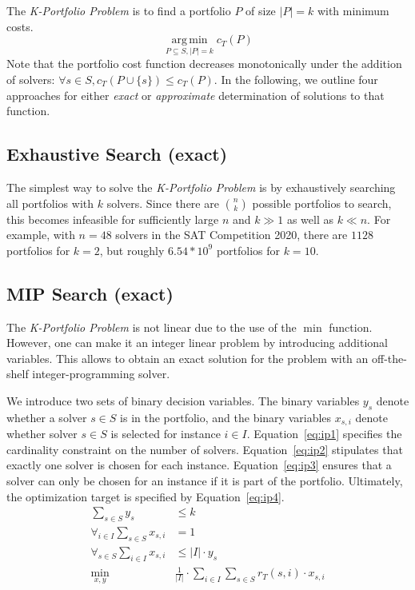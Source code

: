 \documentclass[conference]{IEEEtran}
\DeclareMathOperator*{\argmin}{arg\,min}
\begin{document}
The \emph{K-Portfolio Problem} is to find a portfolio $P$ of size $|P| = k$ with minimum costs.%
$$
\argmin\limits_{P \subseteq S, |P| = k} c_{T}(P)
$$
Note that the portfolio cost function decreases monotonically under the addition of solvers: $\forall s \in S, c_{T}(P \cup \{s\}) \leq c_{T}(P)$. 
In the following, we outline four approaches for either \emph{exact} or \emph{approximate} determination of solutions to that function. 

\subsection{Exhaustive Search (exact)}

The simplest way to solve the \emph{K-Portfolio Problem} is by exhaustively searching all portfolios with $k$ solvers. 
Since there are $\binom{n}{k}$ possible portfolios to search, this becomes infeasible for sufficiently large $n$ and $k \gg 1$ as well as $k \ll n$.
For example, with $n=48$ solvers in the SAT Competition 2020, there are $1128$ portfolios for $k=2$, but roughly $6.54 * 10^9$ portfolios for $k=10$.

\subsection{MIP Search (exact)}

The \emph{K-Portfolio Problem} is not linear due to the use of the $\min$ function.
However, one can make it an integer linear problem by introducing additional variables.
This allows to obtain an exact solution for the problem with an off-the-shelf integer-programming solver.

We introduce two sets of binary decision variables. 
The binary variables $y_s$ denote whether a solver $s \in S$ is in the portfolio, and 
the binary variables $x_{s,i}$ denote whether solver $s \in S$ is selected for instance $i \in I$. 
Equation~\ref{eq:ip1} specifies the cardinality constraint on the number of solvers. 
Equation~\ref{eq:ip2} stipulates that exactly one solver is chosen for each instance. 
Equation~\ref{eq:ip3} ensures that a solver can only be chosen for an instance if it is part of the portfolio. 
Ultimately, the optimization target is specified by Equation~\ref{eq:ip4}.%
\begin{align}
	\sum_{s \in S} y_s &\leq k \label{eq:ip1}\\
	\forall_{i\in I} \sum_{s \in S} x_{s,i} &= 1 \label{eq:ip2}\\
	\forall_{s \in S} \sum_{i \in I} x_{s,i} &\leq |I| \cdot y_s \label{eq:ip3}\\
	\min_{x,y} \quad & \frac{1}{|I|} \cdot \sum_{i \in I} \sum_{s \in S} r_T(s,i) \cdot x_{s,i} \label{eq:ip4}
\end{align}
\end{document}
